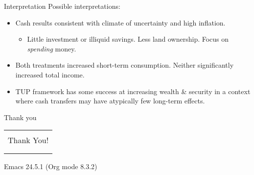 \documentclass[t,presentation]{beamer}
\begin{document}
\begin{frame}[label={sec:orgheadline24}]{Interpretation}
Possible interpretations:

\begin{itemize}
\item Cash results consistent with climate of uncertainty and high inflation.

\begin{itemize}
\item Little investment or illiquid savings. Less land ownership. Focus on \emph{spending} money.
\end{itemize}

\item Both treatments increased short-term consumption. Neither significantly increased total income.

\item TUP framework has some success at increasing wealth \& security in a context where cash transfers may have atypically few long-term effects.
\end{itemize}
\end{frame}

\begin{frame}[label={sec:orgheadline25}]{Thank you}
\begin{center}
\begin{tabular}{l}
\hline
\\
\hline
\\
Thank You!\\
\\
\hline
\\
\hline
\end{tabular}
\end{center}
\end{frame}
Emacs 24.5.1 (Org mode 8.3.2)
\end{document}
